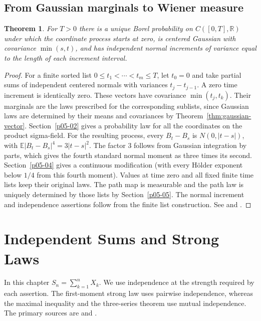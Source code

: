 \documentclass[11pt,oneside,openany]{book}
\newcommand{\E}{\mathbb{E}}
\newcommand{\R}{\mathbb{R}}
\theoremstyle{plain}
\newtheorem{theorem}{Theorem}[chapter]
\theoremstyle{definition}
\theoremstyle{remark}
\begin{document}
\section{From Gaussian marginals to Wiener measure}
\label{p07-06}

\begin{theorem}\label{thm:wiener}
For \(T>0\) there is a unique Borel probability on \(C([0,T],\R)\)
under which the coordinate process starts at zero, is centered Gaussian
with covariance \(\min(s,t)\), and has independent normal increments of
variance equal to the length of each increment interval.
\end{theorem}

\begin{proof}
For a finite sorted list \(0\le t_1<\cdots<t_m\le T\), let
\(t_0=0\) and take partial sums of independent centered normals with
variances \(t_j-t_{j-1}\). A zero time increment is identically zero.
These vectors have covariance \(\min(t_j,t_k)\). Their marginals are
the laws prescribed for the corresponding sublists, since Gaussian
laws are determined by their means and covariances by
Theorem~\ref{thm:gaussian-vector}. Section~\ref{p05-02} gives a
probability law for all the coordinates on the product sigma-field.
For the resulting process, every \(B_t-B_s\) is
\(N(0,|t-s|)\), with
\(\E|B_t-B_s|^4=3|t-s|^2\). The factor \(3\) follows from Gaussian
integration by parts, which gives the fourth standard normal moment
as three times its second. Section~\ref{p05-04} gives a continuous
modification (with every H\"older exponent below \(1/4\) from this
fourth moment). Values at time zero and all fixed finite time lists
keep their original laws. The path map is measurable and the path
law is uniquely determined by those lists by Section~\ref{p05-05}.
The normal increment and independence assertions follow from the
finite list construction. See \cite[Chapter 14]{Kallenberg} and
\cite[Section 8]{Billingsley}.
\end{proof}
\chapter{Independent Sums and Strong Laws}
\label{chap:sums}

In this chapter \(S_n=\sum_{k=1}^n X_k\). We use independence at the
strength required by each assertion. The first-moment strong law uses
pairwise independence, whereas the maximal inequality and the
three-series theorem use mutual independence. The primary sources are
\cite[Chapter 2]{Durrett} and \cite[Chapter 5]{Kallenberg}.
\end{document}

